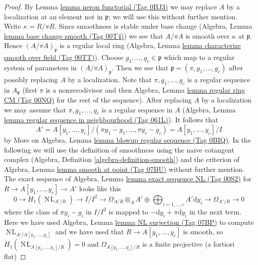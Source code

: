 \documentclass{amsart}
\theoremstyle{plain}
\theoremstyle{definition}
\theoremstyle{remark}
\numberwithin{equation}{subsection}
\def\NL{\mathop{N\!L}\nolimits}
\begin{document}
\begin{proof}
By Lemma \href{https://stacks.math.columbia.edu/tag/0BJ3}{lemma neron functorial (Tag 0BJ3)} we may replace $A$ by a localization
at an element not in $\mathfrak p$; we will use this without further mention.
Write $\kappa = R/\pi R$. Since smoothness is stable under base change
(Algebra, Lemma \href{https://stacks.math.columbia.edu/tag/00T4}{lemma base change smooth (Tag 00T4)})
we see that $A/\pi A$ is smooth over $\kappa$ at $\mathfrak p$.
Hence $(A/\pi A)_\mathfrak p$ is a regular local ring
(Algebra, Lemma \href{https://stacks.math.columbia.edu/tag/00TT}{lemma characterize smooth over field (Tag 00TT)}).
Choose $g_1, \ldots, g_c \in \mathfrak p$ which map to
a regular system of parameters in $(A/\pi A)_\mathfrak p$.
Then we see that $\mathfrak p = (\pi, g_1, \ldots, g_c)$
after possibly replacing $A$ by a localization.
Note that $\pi, g_1, \ldots, g_c$ is a regular sequence
in $A_\mathfrak p$ (first $\pi$ is a nonzerodivisor and
then Algebra, Lemma \href{https://stacks.math.columbia.edu/tag/00NQ}{lemma regular ring CM (Tag 00NQ)}
for the rest of the sequence).
After replacing $A$ by a localization we may assume that
$\pi, g_1, \ldots, g_c$ is a regular sequence in $A$
(Algebra, Lemma \href{https://stacks.math.columbia.edu/tag/061L}{lemma regular sequence in neighbourhood (Tag 061L)}).
It follows that
$$
A' = A[y_1, \ldots, y_c]/(\pi y_1 - g_1, \ldots, \pi y_c - g_c) =
A[y_1, \ldots, y_c]/I
$$
by More on Algebra, Lemma \href{https://stacks.math.columbia.edu/tag/0BIQ}{lemma blowup regular sequence (Tag 0BIQ)}.
In the following we will use the definition of smoothness using the
naive cotangent complex (Algebra, Definition \ref{algebra-definition-smooth})
and the criterion of Algebra, Lemma \href{https://stacks.math.columbia.edu/tag/07BU}{lemma smooth at point (Tag 07BU)}
without further mention.
The exact sequence of Algebra, Lemma \href{https://stacks.math.columbia.edu/tag/00S2}{lemma exact sequence NL (Tag 00S2)}
for $R \to A[y_1, \ldots, y_c] \to A'$ looks like this
$$
0 \to H_1(\NL_{A'/R}) \to I/I^2 \to
\Omega_{A/R} \otimes_A A' \oplus
\bigoplus\nolimits_{i = 1, \ldots, c} A' \text{d}y_i \to
\Omega_{A'/R} \to 0
$$
where the class of $\pi y_i - g_i$ in $I/I^2$ is mapped
to $- \text{d}g_i + \pi \text{d}y_i$ in the next term.
Here we have used Algebra, Lemma \href{https://stacks.math.columbia.edu/tag/07BP}{lemma NL surjection (Tag 07BP)}
to compute $\NL_{A'/A[y_1, \ldots, y_c]}$ and we have used that
$R \to A[y_1, \ldots, y_c]$ is smooth, so
$H_1(\NL_{A[y_1, \ldots, y_c]/R}) = 0$ and
$\Omega_{A[y_1, \ldots, y_c]/R}$ is a finite projective (a fortiori flat)

\end{proof}
\end{document}
